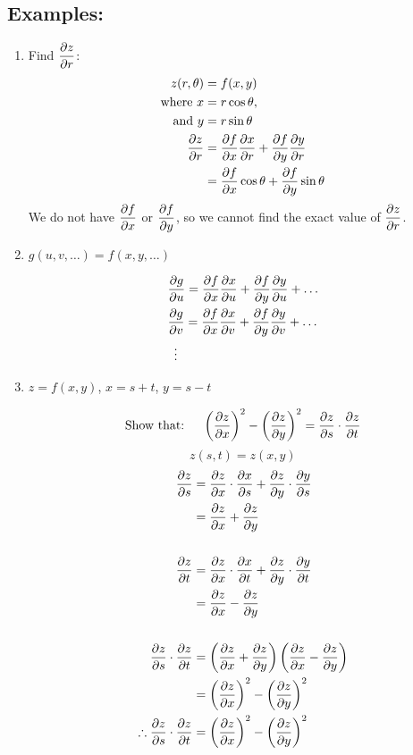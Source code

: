 \subsection{Examples:}

\begin{enumerate}
    
    \item Find $\pd{z}{r}$:
        \begin{align*}
        z(r,\theta) &= f(x, y)\\
        \text{where } x &= r\cos\theta,\\
        \text{ and } y &= r\sin\theta\\
        \pd{z}{r} &= \pd{f}{x}\pd{x}{r} + \pd{f}{y}\pd{y}{r}\\
        &= \pd{f}{x}\cos\theta + \pd{f}{y}\sin\theta
    \end{align*}
    We do not have $\pd{f}{x}$ or $\pd{f}{y}$, so we cannot find the exact value of $\pd{z}{r}$.

    \item $g(u, v, \ldots) = f(x, y, \ldots)$
    
    \begin{align*}
        &\pd{g}{u} = \pd{f}{x}\pd{x}{u} + \pd{f}{y}\pd{y}{u} + \ldots\\
        &\pd{g}{v} = \pd{f}{x}\pd{x}{v} + \pd{f}{y}\pd{y}{v} + \ldots\\
        &\,\,\,\vdots
    \end{align*}

    \item $z = f(x, y)$, $x = s + t$, $y = s - t$
    
        
        \[
            \text{Show that: }\quad \left(\pd{z}{x}\right)^2 - \left(\pd{z}{y}\right)^2 = \pd{z}{s} \cdot \pd{z}{t}
        \]
        \[
            z(s, t) = z(x, y)
        \]
        \begin{align*}
            \pd{z}{s} &= \pd{z}{x}\cdot\pd{x}{s} + \pd{z}{y}\cdot\pd{y}{s}\\
            &= \pd{z}{x} + \pd{z}{y}\\\\
            \pd{z}{t} &= \pd{z}{x}\cdot\pd{x}{t} + \pd{z}{y}\cdot\pd{y}{t}\\
            &= \pd{z}{x} - \pd{z}{y}\\\\
            \pd{z}{s}\cdot\pd{z}{t} &= \left(\pd{z}{x} + \pd{z}{y}\right)\left(\pd{z}{x} - \pd{z}{y}\right)\\
            &= \left(\pd{z}{x}\right)^2 - \left(\pd{z}{y}\right)^2\\
            \therefore \pd{z}{s}\cdot\pd{z}{t} &= \left(\pd{z}{x}\right)^2 - \left(\pd{z}{y}\right)^2
        \end{align*}

\end{enumerate}